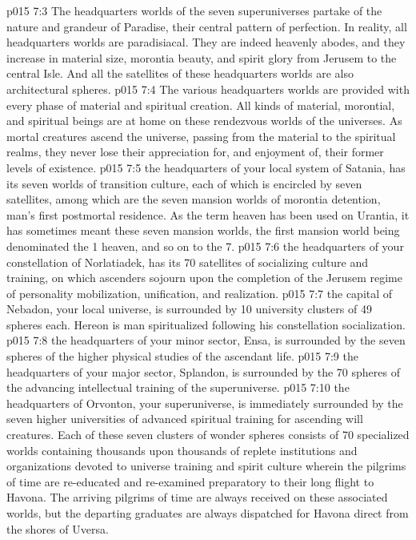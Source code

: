 \vs p015 7:3 \pc The headquarters worlds of the seven superuniverses partake of the nature and grandeur of Paradise, their central pattern of perfection. In reality, all headquarters worlds are paradisiacal. They are indeed heavenly abodes, and they increase in material size, morontia beauty, and spirit glory from Jerusem to the central Isle. And all the satellites of these headquarters worlds are also architectural spheres.
\vs p015 7:4 The various headquarters worlds are provided with every phase of material and spiritual creation. All kinds of material, morontial, and spiritual beings are at home on these rendezvous worlds of the universes. As mortal creatures ascend the universe, passing from the material to the spiritual realms, they never lose their appreciation for, and enjoyment of, their former levels of existence.
\vs p015 7:5 \pc {} the headquarters of your local system of Satania, has its seven worlds of transition culture, each of which is encircled by seven satellites, among which are the seven mansion worlds of morontia detention, man’s first postmortal residence. As the term heaven has been used on Urantia, it has sometimes meant these seven mansion worlds, the first mansion world being denominated the 1 heaven, and so on to the 7.
\vs p015 7:6 \pc {} the headquarters of your constellation of Norlatiadek, has its 70 satellites of socializing culture and training, on which ascenders sojourn upon the completion of the Jerusem regime of personality mobilization, unification, and realization.
\vs p015 7:7 \pc {} the capital of Nebadon, your local universe, is surrounded by 10 university clusters of 49 spheres each. Hereon is man spiritualized following his constellation socialization.
\vs p015 7:8 \pc {} the headquarters of your minor sector, Ensa, is surrounded by the seven spheres of the higher physical studies of the ascendant life.
\vs p015 7:9 \pc {} the headquarters of your major sector, Splandon, is surrounded by the 70 spheres of the advancing intellectual training of the superuniverse.
\vs p015 7:10 \pc {} the headquarters of Orvonton, your superuniverse, is immediately surrounded by the seven higher universities of advanced spiritual training for ascending will creatures. Each of these seven clusters of wonder spheres consists of 70 specialized worlds containing thousands upon thousands of replete institutions and organizations devoted to universe training and spirit culture wherein the pilgrims of time are re\hyp{}educated and re\hyp{}examined preparatory to their long flight to Havona. The arriving pilgrims of time are always received on these associated worlds, but the departing graduates are always dispatched for Havona direct from the shores of Uversa.
